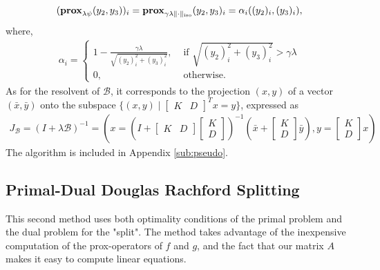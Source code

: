 \documentclass{article}
\theoremstyle{definition}
\theoremstyle{remark}
\begin{document}
  \begin{equation*}
    \begin{split}
      (\operatorname{\mathbf{prox}}_{\lambda \psi}(y_2, y_3))_i = \operatorname{\mathbf{prox}}_{\gamma \lambda \| \cdot \|_{\operatorname{{iso}}}} (y_2, y_3)_{i}= \alpha_i ((y_2)_i, (y_3)_i), 
    \end{split}
  \end{equation*}
  where,
  \begin{equation*}
    \begin{split}
      \alpha_i = 
      \begin{cases}
        1 - \frac{\gamma \lambda }{\sqrt{(y_2)_i^2 + (y_3)_i^2}},  &\text{ if }\sqrt{(y_2)_i^2 + (y_3)_i^2}> \gamma \lambda \\ 
         0, &\text{ otherwise. }
      \end{cases}
    \end{split}
  \end{equation*}
  As for the resolvent of $\mathcal{B}$, it corresponds to the projection $(x, y)$ of a vector $(\bar x, \bar y)$ onto the subspace $\{(x, y) \mid
\begin{bmatrix}
  K &D
        \end{bmatrix}^Tx = y\}$, expressed as
 \begin{equation*}
  \begin{split}
    J_{\mathcal{B}} = (I + \lambda \mathcal{B})^{-1} =\left(x=\left(I+ \begin{bmatrix}
      K &D
        \end{bmatrix} \begin{bmatrix}
          K \\D
        \end{bmatrix}\right)^{-1}\left(\bar x +  \begin{bmatrix}
          K \\D
        \end{bmatrix}\bar y\right), y= \begin{bmatrix}
          K \\D
        \end{bmatrix}x \right)
  \end{split}
 \end{equation*}
 The algorithm is included in Appendix \ref{sub:pseudo}.

\subsection{Primal-Dual Douglas Rachford Splitting}\label{sub:Primal-Dual Douglas Rachford splitting}
This second method uses both optimality conditions of the primal problem
and the dual problem for the "split". The method takes advantage of the inexpensive computation of the prox-operators of $f$ and $g$, and the fact that our matrix $A$ makes it easy to compute linear equations.
\end{document}
